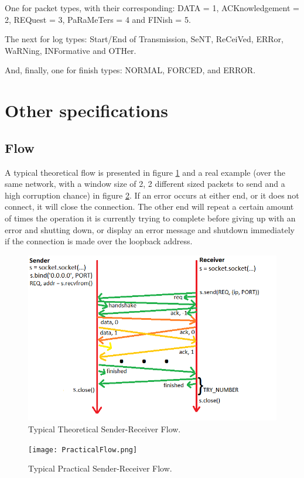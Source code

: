 \documentclass[12pt]{article}
\begin{document}
One for packet types, with their corresponding: DATA = 1, ACKnowledgement = 2, REQuest = 3, PaRaMeTers = 4 and FINish = 5.

The next for log types: Start/End of Transmission, SeNT, ReCeiVed, ERRor, WaRNing, INFormative and OTHer.

And, finally, one for finish types: NORMAL, FORCED, and ERROR.

\section{Other specifications}

\subsection{Flow}

A typical theoretical flow is presented in figure \ref{fig:fig2} and a real example (over the same network, with a window size of 2, 2 different sized packets to send and a high corruption chance)  in figure \ref{fig:fig3}. If an error occurs at either end, or it does not connect, it will close the connection. The other end will repeat a certain amount of times the operation it is currently trying to complete before giving up with an error and shutting down, or display an error message and shutdown immediately if the connection is made over the loopback address.

\begin{figure}[!htb]
	\centering
	\includegraphics[width=.9\linewidth]{TheoreticalFlow.png}
	\caption{Typical Theoretical Sender-Receiver Flow.}\label{fig:fig2}
\end{figure}

\begin{figure}[!htb]
	\centering
	\texttt{[image: PracticalFlow.png]}
		\caption{Typical Practical Sender-Receiver Flow.}\label{fig:fig3}
\end{figure}
\end{document}
